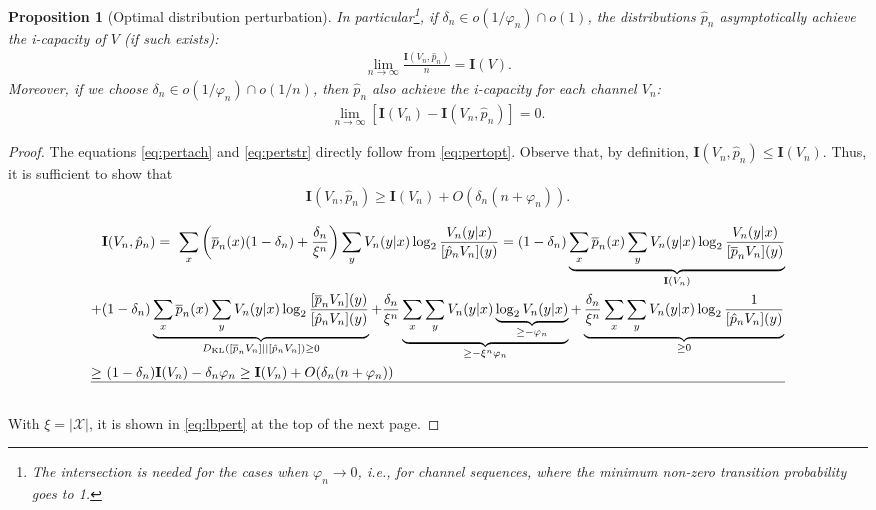 \documentclass[journal, twocol]{IEEEtran}
\newcommand{\op}{{\overline{p}}}
\newcommand{\hp}{{\hat{p}}}
\newcommand{\bfI}{{\mathbf{I}}}
\newcommand{\mX}{{\mathcal{X}}}
\newcommand{\br}[1]{{\left({#1}\right)}}
\newcommand{\brsq}[1]{{\left[{#1}\right]}}
\newcommand{\vp}{\varphi}
\newtheorem{proposition}{Proposition}
\newcommand{\pWy}[2]{[{#1}{#2}]}
\newcommand{\pWyd}[2]{[{#1}{#2}]}
\begin{document}
\begin{appendices}
\begin{proposition}[Optimal distribution perturbation]
In particular\footnote{The intersection is needed for the cases when $\vp_n\to 0$, i.e., for channel sequences, where the minimum non-zero transition probability goes to 1.}, if $\delta_n \in o(1/\vp_n)\cap o(1)$, the distributions $\hp_n$ asymptotically achieve the i-capacity of $V$ (if such exists):
\begin{align}
\lim_{n\to\infty}\frac{\bfI(V_n,\hp_n)}{n}=\bfI(V).
\label{eq:pertach}
\end{align}
Moreover, if we choose $\delta_n \in o(1/\vp_n) \cap o\br{1/n}$, then $\hp_n$ also achieve the i-capacity for each channel $V_n$:
\begin{align}
\lim_{n\to\infty}\brsq{\bfI(V_n)-\bfI(V_n,\hp_n)}=0.
\label{eq:pertstr}
\end{align}
\end{proposition}
\begin{proof}
The equations \eqref{eq:pertach} and \eqref{eq:pertstr} directly follow from \eqref{eq:pertopt}.
Observe that, by definition, $\bfI(V_n,\hp_n)\leq \bfI(V_n)$.
Thus, it is sufficient to show that
\begin{align}
\bfI(V_n,\hp_n) \geq \bfI(V_n)+O(\delta_n(n+\vp_n)).
\label{eq:pertosm}
\end{align}%
\begin{figure}[t]
\begin{align}
&\bfI(V_n,\hp_n)
=~
\sum_{x}\br{\op_n(x)\br{1-\delta_n}+\frac{\delta_n}{\xi^n}}
\sum_y V_n(y|x) \log_2\frac{V_n(y|x)}{\pWyd{\hp_n}{V_n}(y)}
=
\br{1-\delta_n}\underbrace{\sum_{x}\op_n(x)\sum_y V_n(y|x)\log_2\frac{V_n(y|x)}{\pWyd{\op_n}{V_n}(y)}}_{\bfI(V_n)}
\nonumber \\
+&
\br{1-\delta_n}
\underbrace{
\sum_{x}\op_n(x)\sum_y V_n(y|x)\log_2\frac{\pWyd{\op_n}{V_n}(y)}{\pWyd{\hp_n}{V_n}(y)}
}_{D_\text{KL}\br{\pWy{\op_n}{V_n} || \pWy{\hp_n}{V_n}}\geq 0}
+
\frac{\delta_n}{\xi^n}
\underbrace{
\sum_{x}\sum_{y}V_n(y|x)\underbrace{\log_2 V_n(y|x)}_{\geq-\vp_n}
}_{\geq -\xi^n \vp_n}
+
\underbrace{\frac{\delta_n}{\xi^n}\sum_{x}\sum_{y}V_n(y|x)
\log_2 \frac{1}{\pWyd{\hp_n}{V_n}(y)}}_{\geq 0}
\nonumber \\
\geq &~
\br{1-\delta_n}\bfI(V_n)-\delta_n\vp_n
\geq 
\bfI(V_n)+O(\delta_n(n +\vp_n))
\label{eq:lbpert}
\\
\hline \nonumber  
\end{align}
\end{figure}%
With $\xi=|\mX|$, it is shown in \eqref{eq:lbpert} at the top of the next page.
\end{proof}


\end{appendices}
\end{document}
